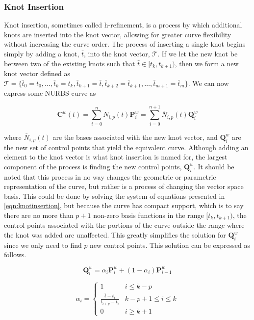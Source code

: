 \subsubsection{Knot Insertion}
Knot insertion, sometimes called h-refinement, is a process by which additional knots are inserted into the knot vector, allowing for greater curve flexibility without increasing the curve order. The process of inserting a single knot begins simply by adding a knot, \(\bar{t}\), into the knot vector, \(\mathcal{T}\). If we let the new knot be between two of the existing knots such that \(\bar{t} \in [t_{k},t_{k+1})\), then we form a new knot vector defined as \(\mathcal{T}=\{\bar{t}_0=t_0,\ldots,\bar{t}_k=t_k, \bar{t}_{k+1}=\bar{t},\bar{t}_{k+2}=\bar{t}_{k+1},\ldots,\bar{t}_{m+1}=\bar{t}_m \}\). We can now express some NURBS curve as

\begin{equation}
\label{eqn:knotinsertion}
	\mathbf{C}^w(t) = \sum^{n}_{i=0} N_{i,p}(t) \mathbf{P}_i^w = \sum^{n+1}_{i=0} \bar{N}_{i,p}(t) \mathbf{Q}_i^w
\end{equation}

where \(\bar{N}_{i,p}(t)\) are the bases associated with the new knot vector, and \(\mathbf{Q}_i^w\) are the new set of control points that yield the equivalent curve. Although adding an element to the knot vector is what knot insertion is named for, the largest component of the process is finding the new control points, \(\mathbf{Q}_i^w\). It should be noted that this process in no way changes the geometric or parametric representation of the curve, but rather is a process of changing the vector space basis. This could be done by solving the system of equations presented in \cref{eqn:knotinsertion}, but because the curve has compact support, which is to say there are no more than \(p+1\) non-zero basis functions in the range \([t_{k},t_{k+1})\), the control points associated with the portions of the curve outside the range where the knot was added are unaffected. This greatly simplifies the solution for \(\mathbf{Q}_i^w\) since we only need to find $p$ new control points. This solution can be expressed as follows.

\begin{equation}
\label{eqn:knotinsertioncpcalc}
	\mathbf{Q}_i^w = \alpha_i \mathbf{P}_i^w + (1-\alpha_i)\mathbf{P}_{i-1}^w
\end{equation}

\[
\alpha_i = 
\begin{cases}
1 & i\leq k-p\\
\frac{\bar{t}-t_i}{t_{i+p} - t_i} & k-p+1 \leq i \leq k\\
0 & i \geq k+1
\end{cases}
\]

